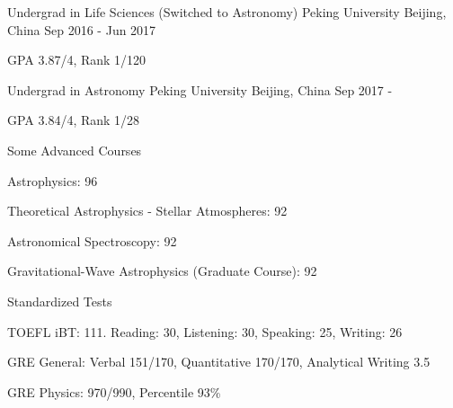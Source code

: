 


\begin{cventries}


\cventry
{Undergrad in Life Sciences (Switched to Astronomy)} %
{Peking University} %
{Beijing, China} %
{Sep 2016 - Jun 2017} %
{ %
	\begin{cvitems}
		\item {GPA 3.87/4, Rank 1/120}
	\end{cvitems}
}

\cventry
{Undergrad in Astronomy} %
{Peking University} %
{Beijing, China} %
{Sep 2017 - } %
{ %
	\begin{cvitems}
		\item {GPA 3.84/4, Rank 1/28}
	\end{cvitems}
}

\cventry
{Some Advanced Courses} %
{} %
{} %
{} %
{ %
	\begin{cvitems}
		\item {Astrophysics: 96}
		\item {Theoretical Astrophysics - Stellar Atmospheres: 92}
		\item {Astronomical Spectroscopy: 92}
		\item {Gravitational-Wave Astrophysics (Graduate Course): 92}
	\end{cvitems}
}

\cventry
{Standardized Tests} %
{} %
{} %
{} %
{ %
	\begin{cvitems}
		\item {TOEFL iBT: 111. Reading: 30, Listening: 30, Speaking: 25, Writing: 26}
		\item {GRE General: Verbal 151/170, Quantitative 170/170, Analytical Writing 3.5}
		\item {GRE Physics: 970/990, Percentile 93\%}
	\end{cvitems}
}


\end{cventries}